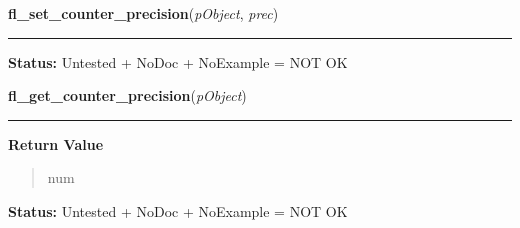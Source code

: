     \label{xformslib:library:fl_set_counter_precision}

    \vspace{0.5ex}

\hspace{.8\funcindent}\begin{boxedminipage}{\funcwidth}

    \raggedright \textbf{fl\_set\_counter\_precision}(\textit{pObject}, \textit{prec})

    \vspace{-1.5ex}

    \rule{\textwidth}{0.5\fboxrule}
\setlength{\parskip}{2ex}
\setlength{\parskip}{1ex}
\textbf{Status:} Untested + NoDoc + NoExample = NOT OK



    \end{boxedminipage}

    \label{xformslib:library:fl_get_counter_precision}

    \vspace{0.5ex}

\hspace{.8\funcindent}\begin{boxedminipage}{\funcwidth}

    \raggedright \textbf{fl\_get\_counter\_precision}(\textit{pObject})

    \vspace{-1.5ex}

    \rule{\textwidth}{0.5\fboxrule}
\setlength{\parskip}{2ex}
\setlength{\parskip}{1ex}
      \textbf{Return Value}
    \vspace{-1ex}

      \begin{quote}
      num

      \end{quote}

\textbf{Status:} Untested + NoDoc + NoExample = NOT OK



    \end{boxedminipage}

    \label{xformslib:library:fl_set_counter_return}


